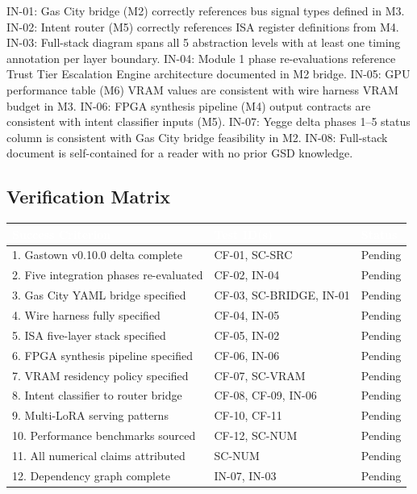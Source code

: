\documentclass[11pt,letterpaper]{article}
\newcommand{\tableheader}[1]{\textbf{\sffamily\textcolor{white}{#1}}}
\begin{document}
IN-01: Gas City bridge (M2) correctly references bus signal types defined in M3. IN-02: Intent router (M5) correctly references ISA register definitions from M4. IN-03: Full-stack diagram spans all 5 abstraction levels with at least one timing annotation per layer boundary. IN-04: Module 1 phase re-evaluations reference Trust Tier Escalation Engine architecture documented in M2 bridge. IN-05: GPU performance table (M6) VRAM values are consistent with wire harness VRAM budget in M3. IN-06: FPGA synthesis pipeline (M4) output contracts are consistent with intent classifier inputs (M5). IN-07: Yegge delta phases 1--5 status column is consistent with Gas City bridge feasibility in M2. IN-08: Full-stack document is self-contained for a reader with no prior GSD knowledge.

\subsection{Verification Matrix}

\begin{center}
\begin{tabularx}{\textwidth}{XL{3.5cm}C{1.5cm}}
\toprule
{}
\tableheader{Success Criterion} & \tableheader{Test ID(s)} & \tableheader{Status} \\
. Gastown v0.10.0 delta complete & CF-01, SC-SRC & Pending \\
2. Five integration phases re-evaluated & CF-02, IN-04 & Pending \\
3. Gas City YAML bridge specified & CF-03, SC-BRIDGE, IN-01 & Pending \\
4. Wire harness fully specified & CF-04, IN-05 & Pending \\
5. ISA five-layer stack specified & CF-05, IN-02 & Pending \\
6. FPGA synthesis pipeline specified & CF-06, IN-06 & Pending \\
7. VRAM residency policy specified & CF-07, SC-VRAM & Pending \\
8. Intent classifier to router bridge & CF-08, CF-09, IN-06 & Pending \\
9. Multi-LoRA serving patterns & CF-10, CF-11 & Pending \\
10. Performance benchmarks sourced & CF-12, SC-NUM & Pending \\
11. All numerical claims attributed & SC-NUM & Pending \\
12. Dependency graph complete & IN-07, IN-03 & Pending \\
\bottomrule
\end{tabularx}
\end{center}
\end{document}
